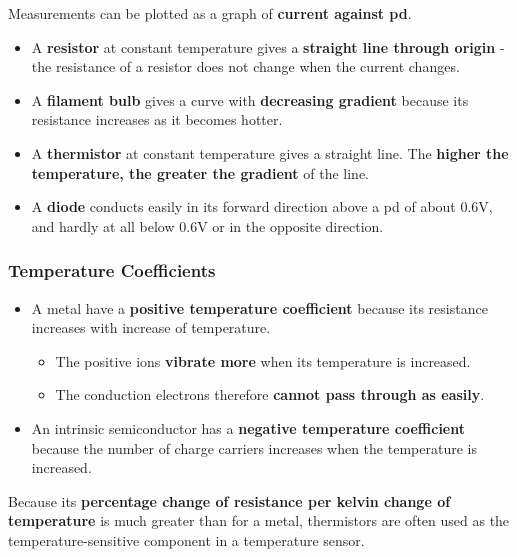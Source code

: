 Measurements can be plotted as a graph of \textbf{current against pd}.
\begin{itemize}
    \item A \textbf{resistor} at constant temperature gives a \textbf{straight line through origin} - the resistance of a resistor does not change when the current changes.
    \item A \textbf{filament bulb} gives a curve with \textbf{decreasing gradient} because its resistance increases as it becomes hotter.
    \item A \textbf{thermistor} at constant temperature gives a straight line. The \textbf{higher the temperature, the greater the gradient} of the line.
    \item A \textbf{diode} conducts easily in its forward direction above a pd of about 0.6V, and hardly at all below 0.6V or in the opposite direction.
\end{itemize}

\subsubsection*{Temperature Coefficients}

\begin{itemize}
    \item A metal have a \textbf{positive temperature coefficient} because its resistance increases with increase of temperature.
        \begin{itemize}
            \item The positive ions \textbf{vibrate more} when its temperature is increased.
            \item The conduction electrons therefore \textbf{cannot pass through as easily}.
        \end{itemize}
    \item An intrinsic semiconductor has a \textbf{negative temperature coefficient} because the number of charge carriers increases when the temperature is increased.
\end{itemize}

Because its \textbf{percentage change of resistance per kelvin change of temperature} is much greater than for a metal, thermistors are often used as the temperature-sensitive component in a temperature sensor.
